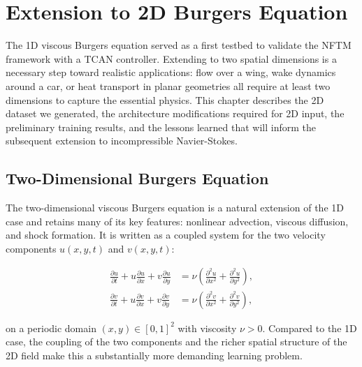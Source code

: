 \chapter{Extension to 2D Burgers Equation}
\label{chap:2d}

The 1D viscous Burgers equation served as a first testbed to validate the NFTM framework with a TCAN controller. Extending to two spatial dimensions is a necessary step toward realistic applications: flow over a wing, wake dynamics around a car, or heat transport in planar geometries all require at least two dimensions to capture the essential physics. This chapter describes the 2D dataset we generated, the architecture modifications required for 2D input, the preliminary training results, and the lessons learned that will inform the subsequent extension to incompressible Navier-Stokes.

\section{Two-Dimensional Burgers Equation}
\label{sec:2d_burgers_equation}

The two-dimensional viscous Burgers equation is a natural extension of the 1D case and retains many of its key features: nonlinear advection, viscous diffusion, and shock formation. It is written as a coupled system for the two velocity components $u(x,y,t)$ and $v(x,y,t)$:

\begin{align}
  \frac{\partial u}{\partial t} + u\frac{\partial u}{\partial x} + v\frac{\partial u}{\partial y}
  &= \nu\left(\frac{\partial^2 u}{\partial x^2} + \frac{\partial^2 u}{\partial y^2}\right),
  \label{eq:2d_burgers_u} \\[6pt]
  \frac{\partial v}{\partial t} + u\frac{\partial v}{\partial x} + v\frac{\partial v}{\partial y}
  &= \nu\left(\frac{\partial^2 v}{\partial x^2} + \frac{\partial^2 v}{\partial y^2}\right),
  \label{eq:2d_burgers_v}
\end{align}

on a periodic domain $(x,y)\in[0,1]^2$ with viscosity $\nu > 0$. Compared to the 1D case, the coupling of the two components and the richer spatial structure of the 2D field make this a substantially more demanding learning problem.

